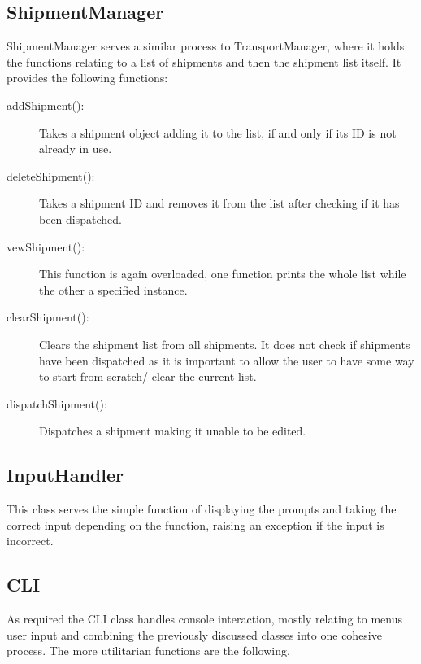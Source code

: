 \documentclass[12pt, a4paper]{report}
\begin{document}
\subsection{ShipmentManager}
ShipmentManager serves a similar process to TransportManager, where it holds the functions relating to a list of shipments and then the shipment list itself. It provides the following functions:
\begin{description}
   \item [addShipment():] Takes a shipment object adding it to the list, if and only if its ID is not already in use.
   \item[deleteShipment():] Takes a shipment ID and removes it from the list after checking if it has been dispatched.
   \item[vewShipment():] This function is again overloaded, one function prints the whole list while the other a specified instance. 
   \item[clearShipment():] Clears the shipment list from all shipments. It does not check if shipments have been dispatched as it is important to allow the user to have some way to start from scratch/ clear the current list.
   \item[dispatchShipment():] Dispatches a shipment making it unable to be edited.
\end{description}

\subsection{InputHandler}
This class serves the simple function of displaying the prompts and taking the correct input depending on the function, raising an exception if the input is incorrect.

\subsection{CLI}
As required the CLI class handles console interaction, mostly relating to menus user input and combining the previously discussed classes into one cohesive process. The more utilitarian functions are the following.
\end{document}
